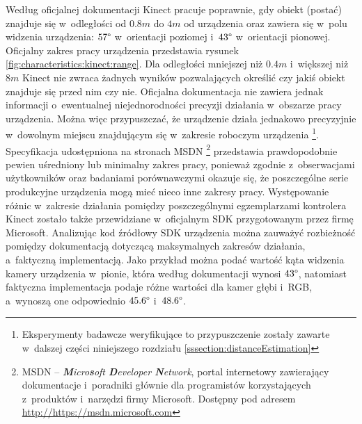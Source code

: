 Według oficjalnej dokumentacji Kinect pracuje poprawnie, gdy obiekt (postać) znajduje się w~odległości od $0.8m$ do $4m$ od urządzenia oraz zawiera się w~polu widzenia urządzenia: $57\degree$ w~orientacji poziomej i~$43\degree$ w~orientacji pionowej. Oficjalny zakres pracy urządzenia przedstawia rysunek \ref{fig:characteristics:kinect:range}. Dla odległości mniejszej niż $0.4m$ i~większej niż $8m$ Kinect nie zwraca żadnych wyników pozwalających określić czy jakiś obiekt znajduje się przed nim czy nie. Oficjalna dokumentacja nie zawiera jednak informacji o~ewentualnej niejednorodności precyzji działania w~obszarze pracy urządzenia. Można więc przypuszczać, że urządzenie działa jednakowo precyzyjnie w~dowolnym miejscu znajdującym się w~zakresie roboczym urządzenia \footnote{Eksperymenty badawcze weryfikujące to przypuszczenie zostały zawarte w~dalszej części niniejszego rozdziału \ref{sssection:distanceEstimation}}. Specyfikacja udostępniona na stronach MSDN \footnote{MSDN -- \emph{\textbf{M}icro\textbf{s}oft \textbf{D}eveloper \textbf{N}etwork}, portal internetowy zawierający dokumentacje i~poradniki głównie dla programistów korzystających z~produktów i~narzędzi firmy Microsoft. Dostępny pod adresem \url{http://https://msdn.microsoft.com}} przedstawia prawdopodobnie pewien uśredniony lub minimalny zakres pracy, ponieważ zgodnie z~obserwacjami użytkowników oraz badaniami porównawczymi \cite{DiFilippo2015} okazuje się, że poszczególne serie produkcyjne urządzenia mogą mieć nieco inne zakresy pracy. Występowanie różnic w~zakresie działania pomiędzy poszczególnymi egzemplarzami kontrolera Kinect zostało także przewidziane w~oficjalnym SDK przygotowanym przez firmę Microsoft. Analizując kod źródłowy SDK urządzenia można zauważyć rozbieżność pomiędzy dokumentacją dotyczącą maksymalnych zakresów działania, a~faktyczną implementacją. Jako przykład można podać wartość kąta widzenia kamery urządzenia w~pionie, która według dokumentacji wynosi $43\degree$, natomiast faktyczna implementacja podaje różne wartości dla kamer głębi i~RGB, a~wynoszą one odpowiednio $45.6\degree$ i~$48.6\degree$. 
																															
